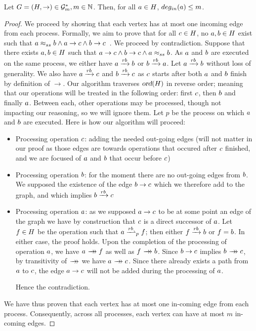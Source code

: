 

\begin{lemma}
Let $G=(H,\rightarrow)\in\mathcal{G}^*_m,m\in\mathbb{N}$. Then, for all $a\in H$, \mbox{$deg_{in}(a) \leq m$}.
\end{lemma}
\begin{proof} 

We proceed by showing that each vertex has at most one incoming edge from each process. Formally, we aim to prove that for all $c \in H$, no $a,b\in H$ exist such that $a\approx_{ss}b\land a\rightarrow c \land b\rightarrow c$~. We proceed by contradiction. Suppose that there exists $a,b\in H$ such that $a\rightarrow c\land b\rightarrow c\land a\approx_{ss}b$. As $a$ and $b$ are executed on the same process, we either have $a \xrightarrow{rb} b$ or $b \xrightarrow{rb} a$. Let $a \xrightarrow{rb} b$ without loss of generality. We also have $a \xrightarrow{rb} c$ and $b \xrightarrow{rb} c$ as $c$ starts after both $a$ and $b$ finish by definition of $\rightarrow$. Our algorithm traverses $\textsl{ord}(H)$ in reverse order; meaning that our operations will be treated in the following order: first $c$, then $b$ and finally $a$. Between each, other operations may be processed, though not impacting our reasoning, so we will ignore them. Let $p$ be the process on which $a$ and $b$ are executed. Here is how our algorithm will proceed:
\begin{itemize}
	\item[$\ast$] Processing operation $c$: adding the needed out-going edges (will not matter in our proof as those edges are towards operations that occured after $c$ finished, and we are focused of $a$ and $b$ that occur before $c$)
	\item[$\ast$] Processing operation $b$: for the moment there are no out-going edges from $b$. We supposed the existence of the edge $b\rightarrow c$ which we therefore add to the graph, and which implies $b\xrightarrow{rb}c$
	\item[$\ast$] Processing operation $a$: as we supposed $a\rightarrow c$ to be at some point an edge of the graph we have by construction that $c$ is a direct successor of $a$. Let $f \in H$ be the operation such that $\opa \dsucp{p} \opf$; then either $f\xrightarrow{rb}b$ or $f=b$. In either case, the proof holds. Upon the completion of the processing of operation $a$, we have $\opa \patharrow \opf$ as well as $\opf \patharrow \opb$. Since $b\rightarrow c$ implies $\opb \patharrow \opc$, by transitivity of $\patharrow$ we have $\opa \patharrow \opc$. Since there already exists a path from $a$ to $c$, the edge $a\rightarrow c$ will not be added during the processing of $a$.
	
Hence the contradiction.
\end{itemize}
We have thus proven that each vertex has at most one in-coming edge from each process. Consequently, across all processes, each vertex can have at most $m$ in-coming edges.
\end{proof}

